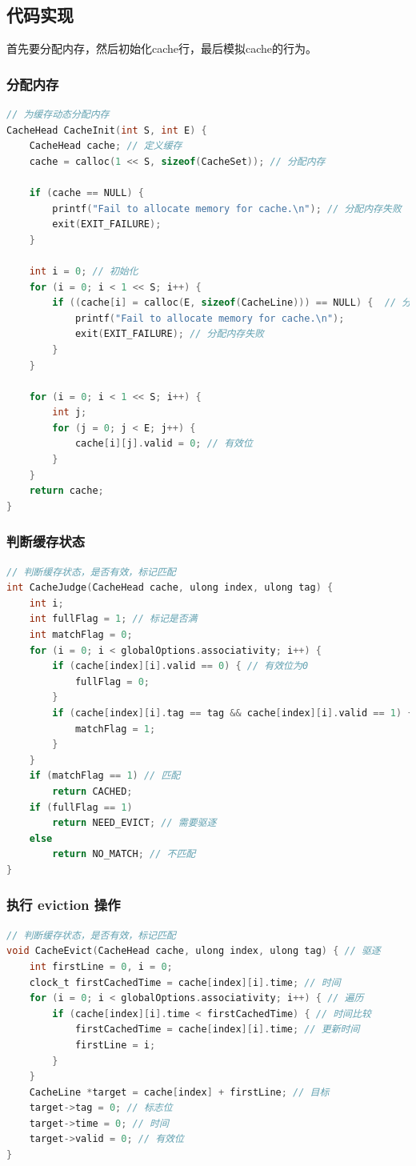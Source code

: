 \subsection{代码实现}
首先要分配内存，然后初始化cache行，最后模拟cache的行为。

\subsubsection{分配内存}

\begin{lstlisting}[language = C , title = { Allocate Memory} ]
// 为缓存动态分配内存
CacheHead CacheInit(int S, int E) { 
	CacheHead cache; // 定义缓存
	cache = calloc(1 << S, sizeof(CacheSet)); // 分配内存

	if (cache == NULL) {
		printf("Fail to allocate memory for cache.\n"); // 分配内存失败
		exit(EXIT_FAILURE);
	}

	int i = 0; // 初始化
	for (i = 0; i < 1 << S; i++) { 
		if ((cache[i] = calloc(E, sizeof(CacheLine))) == NULL) {  // 分配内存
			printf("Fail to allocate memory for cache.\n"); 
			exit(EXIT_FAILURE); // 分配内存失败
		}
	}

	for (i = 0; i < 1 << S; i++) {
		int j;
		for (j = 0; j < E; j++) { 
			cache[i][j].valid = 0; // 有效位
		}
	}
	return cache;
}
\end{lstlisting}

\subsubsection{判断缓存状态}
\begin{lstlisting}[language = C , title = { Judge The Situation Of Cache} ]
// 判断缓存状态，是否有效，标记匹配
int CacheJudge(CacheHead cache, ulong index, ulong tag) {
	int i;
	int fullFlag = 1; // 标记是否满
	int matchFlag = 0;
	for (i = 0; i < globalOptions.associativity; i++) { 
		if (cache[index][i].valid == 0) { // 有效位为0
			fullFlag = 0;
		}
		if (cache[index][i].tag == tag && cache[index][i].valid == 1) { // 有效位为1
			matchFlag = 1;
		}
	}
	if (matchFlag == 1) // 匹配
		return CACHED; 
	if (fullFlag == 1)
		return NEED_EVICT; // 需要驱逐
	else
		return NO_MATCH; // 不匹配
}
\end{lstlisting}

\subsubsection{执行 eviction 操作}
\begin{lstlisting}[language = C , title = {Eviction} ]
// 判断缓存状态，是否有效，标记匹配
void CacheEvict(CacheHead cache, ulong index, ulong tag) { // 驱逐
	int firstLine = 0, i = 0;
	clock_t firstCachedTime = cache[index][i].time; // 时间
	for (i = 0; i < globalOptions.associativity; i++) { // 遍历
		if (cache[index][i].time < firstCachedTime) { // 时间比较
			firstCachedTime = cache[index][i].time; // 更新时间
			firstLine = i;
		}
	}
	CacheLine *target = cache[index] + firstLine; // 目标
	target->tag = 0; // 标志位
	target->time = 0; // 时间
	target->valid = 0; // 有效位
}
\end{lstlisting}

